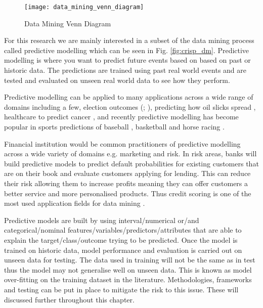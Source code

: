 \begin{figure}[H]
	\texttt{[image: data\_mining\_venn\_diagram]}
	\caption{Data Mining Venn Diagram}
	\label{fig:data_mining_venn_diagram}
\end{figure}

For this research we are mainly interested in a subset of the data mining process called predictive modelling which can be seen in Fig. \ref{fig:crisp_dm}. Predictive modelling is where you want to predict future events based on based on past or historic data. The predictions are trained using past real world events and are tested and evaluated on unseen real world data to see how they perform. 

Predictive modelling can be applied to many applications across a wide range of domains including a few, election outcomes (\citep{silver_signal_2012}; \cite{tumasjan_predicting_2010}), predicting how oil slicks spread \citep{liu_tracking_2011}, healthcare to predict cancer \citep{delen_predicting_2005}, and recently predictive modelling has become popular in sports predictions of baseball \citep{lewis_moneyball_2004}, basketball \citep{stekler_predicting_2012} and horse racing \citep{silverman_predicting_2013}.
 

Financial institution would be common practitioners of predictive modelling across a wide variety of domains e.g. marketing and risk. In risk areas, banks will build predictive models to predict default probabilities for existing customers that are on their book and evaluate customers applying for lending. This can reduce their risk allowing them to increase profits meaning they can offer customers a better service and more personalised products. Thus credit scoring is one of the most used application fields for
data mining \citep{baesens_50_2009}.

Predictive models are built by using interval/numerical or/and categorical/nominal features/variables/predictors/attributes that are able to explain the target/class/outcome trying to be predicted. Once the model is trained on historic data, model performance and evaluation is carried out on unseen data for testing. The data used in training will not be the same as in test thus the model may not generalise well on unseen data. This is known as model over-fitting on the training dataset in the literature. Methodologies, frameworks and testing can be put in place to mitigate the risk to this issue. These will discussed further throughout this chapter.


